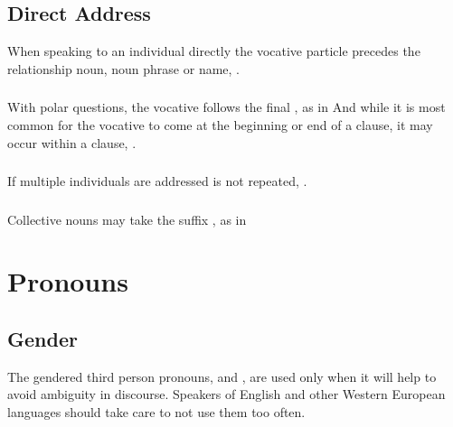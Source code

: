 \subsection{Direct Address}  When speaking to an individual directly
the vocative particle  precedes the relationship noun, noun
phrase or name,    .

\subsubsection{} With polar questions, the vocative follows the
final , as in    And while it is most common for the vocative to come at
the beginning or end of a clause, it may occur within a
clause,  .

\subsubsection{} If multiple individuals are addressed  is not
repeated,  .

\subsubsection{} Collective nouns may take the suffix , as in
 


\section{Pronouns}


\subsection{Gender} The gendered third person pronouns,  and
, are used only when it will help to avoid ambiguity in
discourse.  Speakers of English and other Western European languages
should take care to not use them too often. \label{syn:pron:gender}

